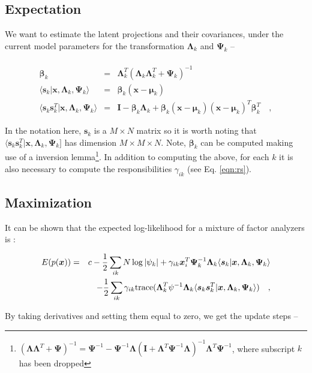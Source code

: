 \documentclass[letterpaper,12pt]{article}
\newcommand{\vect}[1]{\boldsymbol{#1}}
\newcommand{\data}{\vect{x}}
\newcommand{\latent}{\vect{s}}
\newcommand{\mean}{\vect{\mu}}
\newcommand{\eye}{\vect{I}}
\newcommand{\bta}{\vect{\beta}}
\newcommand{\lmda}{\vect{\Lambda}}
\newcommand{\ps}{\vect{\Psi}}
\begin{document}
\subsection{Expectation}

We want to estimate the latent projections and their covariances, under the current model 
parameters for the transformation $\lmda_k$ and $\ps_k$ -- \\ \\

\begin{eqnarray}\displaystyle
\bta_k & = & \lmda_k^T(\lmda_k\lmda_k^T+\ps_k)^{-1}\\
\langle\latent_k|\data,\lmda_k,\ps_k\rangle & = & \bta_k (\data-\mean_k) \\
\langle\latent_k\latent_k^T|\data,\lmda_k,\ps_k\rangle & = & \eye -  \bta_k\lmda_k + \bta_k(\data-\mean_k)(\data-\mean_k)^T\bta_k^T
\quad ,
\end{eqnarray}

In the notation here, $\latent_k$ is a $M\times N$ matrix so it is worth noting that 
$\langle\latent_k\latent_k^T|\data,\lmda_k,\ps_k] $ has dimension $M \times M \times N$.  
Note, $\bta_k$ can be computed making use of a inversion lemma\footnote{
$(\lmda\lmda^T+\ps)^{-1} = \ps^{-1} - \ps^{-1}\lmda(\eye + \lmda^T\ps^{-1}\lmda)^{-1}
\lmda^T\ps^{-1}$, where subscript $k$ has been dropped}.  In addition to computing the 
above, for each $k$ it is also necessary to compute the responsibilities $\gamma_{ik}$ 
(see Eq. \ref{eqn:rs}).

\subsection{Maximization}

It can be shown \citep[for instance,][]{ghahramani96} that the expected log-likelihood for a mixture 
of factor analyzers is :

\begin{eqnarray}\displaystyle
E(p(\data)) &=& c - \frac{1}{2}\sum_{ik} N\log|\psi_k| + \gamma_{ik}\data_i^T\ps_k^{-1}\lmda_k \langle\latent_k|\data,\lmda_k,\ps_k\rangle \\
&& - \frac{1}{2}\sum_{ik} \gamma_{ik}{\rm trace}(\lmda_k^T\psi^{-1}\lmda_k \langle\latent_k\latent_k^T|\data,\lmda_k,\ps_k\rangle )
\quad ,
\end{eqnarray}

By taking derivatives and setting them equal to zero, we get the update steps --
\end{document}
